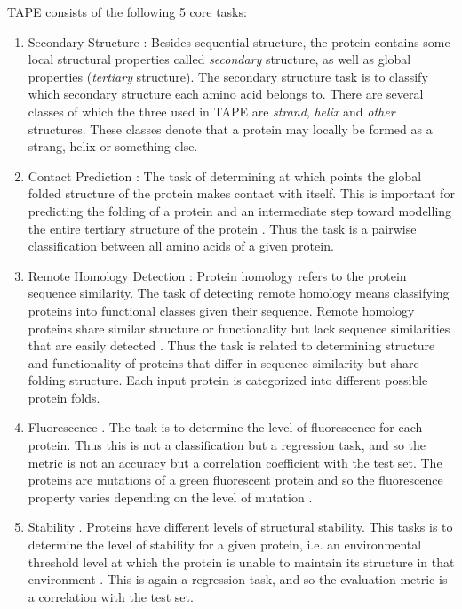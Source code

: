 \documentclass[a4paper,12pt]{article}
\begin{document}
TAPE consists of the following 5 core tasks:
\begin{enumerate}
    \item Secondary Structure \cite{ pdb, casp, netsurfp}: Besides sequential structure, the protein contains some local structural properties called \textit{secondary} structure, as well as global properties (\textit{tertiary} structure). The secondary structure task is to classify which secondary structure each amino acid belongs to. There are several classes of which the three used in TAPE are \textit{strand}, \textit{helix} and \textit{other} structures. These classes denote that a protein may locally be formed as a strang, helix or something else.
    
    \item Contact Prediction \cite{scop, proteinnet}: The task of determining at which points the global folded structure of the protein makes contact with itself. This is important for predicting the folding of a protein and an intermediate step toward modelling the entire tertiary structure of the protein \cite{hamilton2008introduction}. Thus the task is a pairwise classification between all amino acids of a given protein.
    
    \item Remote Homology Detection \cite{scop}: Protein homology refers to the protein sequence similarity. The task of detecting remote homology means classifying proteins into functional classes given their sequence. Remote homology proteins share similar structure or functionality but lack sequence similarities that are easily detected \cite{chen2016protein}. Thus the task is related to determining structure and functionality of proteins that differ in sequence similarity but share folding structure. Each input protein is categorized into different possible protein folds.
    
    \item Fluorescence \cite{sarkisyan2016}. The task is to determine the level of fluorescence for each protein. Thus this is not a classification but a regression task, and so the metric is not an accuracy but a correlation coefficient with the test set. The proteins are mutations of a green fluorescent protein and so the fluorescence property varies depending on the level of mutation \cite{tape2019}.
    
    \item Stability \cite{rocklin2017}. Proteins have different levels of structural stability. This tasks is to determine the level of stability for a given protein, i.e. an environmental threshold level at which the protein is unable to maintain its structure in that environment \cite{tape2019}. This is again a regression task, and so the evaluation metric is a correlation with the test set.
\end{enumerate}
\end{document}
